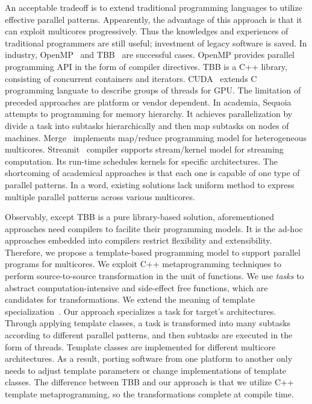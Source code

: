 An acceptable tradeoff is to extend traditional programming
languages to utilize effective parallel patterns. Appearently, the advantage of
this approach is that it can exploit multicores progressively. Thus the
knowledges and
experiences of traditional programmers are still useful; investment
of legacy software is saved. In industry, OpenMP~\cite{openmp}  and
TBB~\cite{tbb} are successful cases. OpenMP provides parallel
programming API in the form of compiler directives. TBB is a C++ library, consisting of concurrent containers and
iterators. CUDA~\cite{cuda} extends C programming languate to describe
groups of threads for GPU. The limitation of preceded approaches are
platform or vendor dependent. In academia,
Sequoia~\cite{sequoia} attempts to programming for memory hierarchy. It
achieves parallelization by divide a task into subtasks hierarchically and then map
subtasks on nodes of machines. Merge~\cite{merge} implements
map/reduce programming model for heterogeneous
multicores. Streamit~\cite{ThiesKA02} compiler supports stream/kernel
model for streaming computation. Its run-time schedules kernels for specific architectures. The shortcoming of academical approaches is that each one
is capable of one type of parallel patterns.  In a word, existing solutions
lack uniform method to express multiple parallel patterns
across various multicores.


Observably, except TBB is a pure library-based solution, aforementioned
approaches need compilers to facilite their programming models. It is
the ad-hoc approaches embedded into compilers restrict flexibility and
extensibility. Therefore, we propose a template-based programming model to
support parallel programs for multicores. We exploit C++
metaprogramming techniques to perform source-to-source transformation
in the unit of functions. We use \emph{tasks} to abstract
computation-intensive and side-effect free functions, which are candidates for transformations. We extend the meaning of template
specialization~\cite{tcpl}. Our approach specializes a task for target's
architectures.  Through applying template classes, a task is
transformed into many subtasks according to different parallel
patterns, and then subtasks are executed in the form of threads.
Template classes are implemented for different multicore
architectures. As a result, porting software from one platform to another only
needs to adjust template parameters or change implementations of
template classes. The difference between TBB and our approach is that
we utilize C++ template metaprogramming, so the transformations complete
at compile time. 

